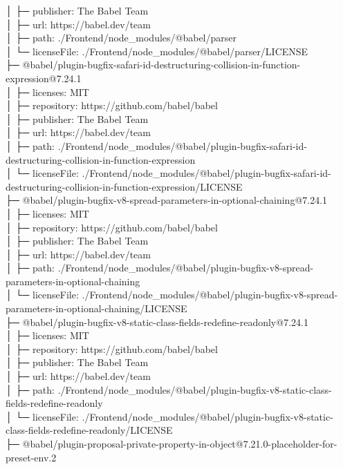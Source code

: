 │  ├─ publisher: The Babel Team\\
│  ├─ url: https://babel.dev/team\\
│  ├─ path: ./Frontend/node\_modules/@babel/parser\\
│  └─ licenseFile: ./Frontend/node\_modules/@babel/parser/LICENSE\\
├─ @babel/plugin-bugfix-safari-id-destructuring-collision-in-function-expression@7.24.1\\
│  ├─ licenses: MIT\\
│  ├─ repository: https://github.com/babel/babel\\
│  ├─ publisher: The Babel Team\\
│  ├─ url: https://babel.dev/team\\
│  ├─ path: ./Frontend/node\_modules/@babel/plugin-bugfix-safari-id-destructuring-collision-in-function-expression\\
│  └─ licenseFile: ./Frontend/node\_modules/@babel/plugin-bugfix-safari-id-destructuring-collision-in-function-expression/LICENSE\\
├─ @babel/plugin-bugfix-v8-spread-parameters-in-optional-chaining@7.24.1\\
│  ├─ licenses: MIT\\
│  ├─ repository: https://github.com/babel/babel\\
│  ├─ publisher: The Babel Team\\
│  ├─ url: https://babel.dev/team\\
│  ├─ path: ./Frontend/node\_modules/@babel/plugin-bugfix-v8-spread-parameters-in-optional-chaining\\
│  └─ licenseFile: ./Frontend/node\_modules/@babel/plugin-bugfix-v8-spread-parameters-in-optional-chaining/LICENSE\\
├─ @babel/plugin-bugfix-v8-static-class-fields-redefine-readonly@7.24.1\\
│  ├─ licenses: MIT\\
│  ├─ repository: https://github.com/babel/babel\\
│  ├─ publisher: The Babel Team\\
│  ├─ url: https://babel.dev/team\\
│  ├─ path: ./Frontend/node\_modules/@babel/plugin-bugfix-v8-static-class-fields-redefine-readonly\\
│  └─ licenseFile: ./Frontend/node\_modules/@babel/plugin-bugfix-v8-static-class-fields-redefine-readonly/LICENSE\\
├─ @babel/plugin-proposal-private-property-in-object@7.21.0-placeholder-for-preset-env.2\\
